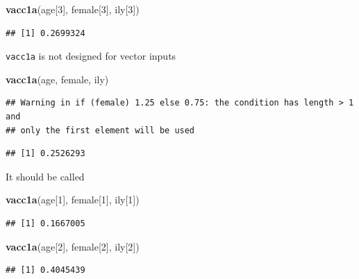 \documentclass[]{book}
\newenvironment{Shaded}{\begin{snugshade}}{\end{snugshade}}
\newcommand{\KeywordTok}[1]{\textcolor[rgb]{0.13,0.29,0.53}{\textbf{#1}}}
\newcommand{\DecValTok}[1]{\textcolor[rgb]{0.00,0.00,0.81}{#1}}
\newcommand{\NormalTok}[1]{#1}
\theoremstyle{definition}
\theoremstyle{definition}
\theoremstyle{definition}
\theoremstyle{remark}
\begin{document}
\begin{Shaded}
\begin{Highlighting}[]
\KeywordTok{vacc1a}\NormalTok{(age[}\DecValTok{3}\NormalTok{], female[}\DecValTok{3}\NormalTok{], ily[}\DecValTok{3}\NormalTok{])}
\end{Highlighting}
\end{Shaded}

\begin{verbatim}
## [1] 0.2699324
\end{verbatim}

\texttt{vacc1a} is not designed for vector inputs

\begin{Shaded}
\begin{Highlighting}[]
\KeywordTok{vacc1a}\NormalTok{(age, female, ily)}
\end{Highlighting}
\end{Shaded}

\begin{verbatim}
## Warning in if (female) 1.25 else 0.75: the condition has length > 1 and
## only the first element will be used
\end{verbatim}

\begin{verbatim}
## [1] 0.2526293
\end{verbatim}

It should be called

\begin{Shaded}
\begin{Highlighting}[]
\KeywordTok{vacc1a}\NormalTok{(age[}\DecValTok{1}\NormalTok{], female[}\DecValTok{1}\NormalTok{], ily[}\DecValTok{1}\NormalTok{])}
\end{Highlighting}
\end{Shaded}

\begin{verbatim}
## [1] 0.1667005
\end{verbatim}

\begin{Shaded}
\begin{Highlighting}[]
\KeywordTok{vacc1a}\NormalTok{(age[}\DecValTok{2}\NormalTok{], female[}\DecValTok{2}\NormalTok{], ily[}\DecValTok{2}\NormalTok{])}
\end{Highlighting}
\end{Shaded}

\begin{verbatim}
## [1] 0.4045439
\end{verbatim}
\end{document}
